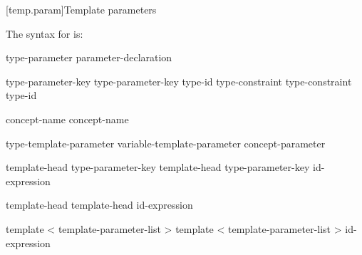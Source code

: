 \documentclass{wg21}
\begin{document}
[temp.param]{Template parameters}

\pnum
The syntax for
is:

\begin{bnf}
    \br
    type-parameter\br
    parameter-declaration\br
\end{bnf}

\begin{bnf}
    \br
    type-parameter-key  \br
    type-parameter-key  \terminal{=} type-id\br
    type-constraint  \br
    type-constraint  \terminal{=} type-id\br
\end{bnf}

\begin{bnf}
    \br
    \br
\end{bnf}

\begin{bnf}
    \br
     concept-name\br
     concept-name \terminal{<}  \terminal{>}
\end{bnf}

\begin{addedblock}
 \begin{bnf}
\br
    type-template-parameter \br
    variable-template-parameter \br
    concept-parameter
\end{bnf}

\begin{bnf}
\br
template-head type-parameter-key  \br
template-head type-parameter-key  \terminal{=} id-expression
\end{bnf}

\begin{bnf}
    \br
    template-head   \br
    template-head   \terminal{=} id-expression
\end{bnf}

\begin{bnf}
    \br
    template < template-parameter-list >   \br
    template < template-parameter-list >   \terminal{=} id-expression
\end{bnf}

\end{addedblock}
\end{document}
